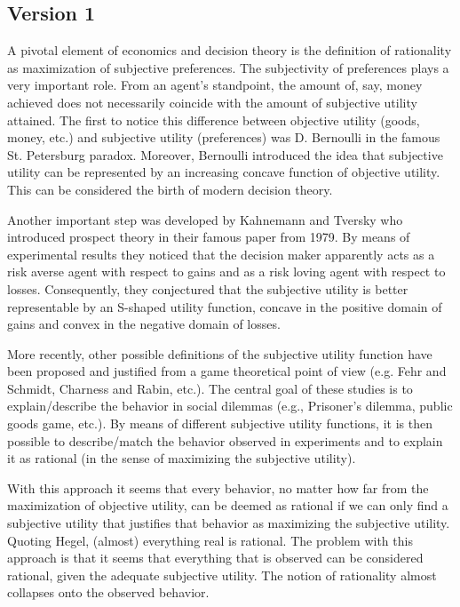 \documentclass[fleqn,reqno,11pt]{article}
\begin{document}
\subsection{Version 1}

A pivotal element of economics and decision theory is the definition of rationality as
maximization of subjective preferences. The subjectivity of preferences plays a very important
role. From an agent's standpoint, the amount of, say, money achieved does not necessarily
coincide with the amount of subjective utility attained. The first to notice this difference
between objective utility (goods, money, etc.) and subjective utility (preferences) was
D. Bernoulli in the famous St. Petersburg paradox. Moreover, Bernoulli introduced the idea that
subjective utility can be represented by an increasing concave function of objective
utility. This can be considered the birth of modern decision theory.

Another important step was developed by Kahnemann and Tversky who introduced prospect theory in
their famous paper from 1979. By means of experimental results they noticed that the decision
maker apparently acts as a risk averse agent with respect to gains and as a risk loving agent
with respect to losses. Consequently, they conjectured that the subjective utility is better
representable by an S-shaped utility function, concave in the positive domain of gains and
convex in the negative domain of losses.

More recently, other possible definitions of the subjective utility function have been proposed
and justified from a game theoretical point of view (e.g. Fehr and Schmidt, Charness and Rabin,
etc.). The central goal of these studies is to explain/describe the behavior in social dilemmas
(e.g., Prisoner's dilemma, public goods game, etc.). By means of different subjective utility
functions, it is then possible to describe/match the behavior observed in experiments and to
explain it as rational (in the sense of maximizing the subjective utility).

With this approach it seems that every behavior, no matter how far from the maximization of
objective utility, can be deemed as rational if we can only find a subjective utility that
justifies that behavior as maximizing the subjective utility. Quoting Hegel, (almost)
everything real is rational. The problem with this approach is that it seems that everything
that is observed can be considered rational, given the adequate subjective utility. The notion
of rationality almost collapses onto the observed behavior.
\end{document}
